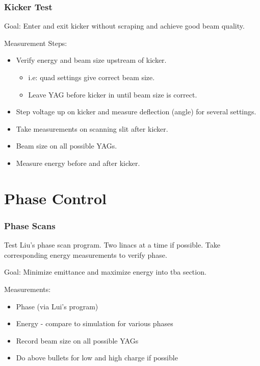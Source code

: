\documentclass[professionalfonts,t]{beamer}
\begin{document}
\begin{frame}
\frametitle{Kicker Test}
Goal: Enter and exit kicker without scraping and achieve good beam quality.
\vspace{1em}

Measurement Steps:
\begin{itemize}
	\item Verify energy and beam size upstream of kicker. 
	\begin{itemize}
		\item i.e: quad settings give correct beam size.
		\item Leave YAG before kicker in until beam size is correct.
	\end{itemize}
	
	\item Step voltage up on kicker and measure
	deflection (angle) for several settings.
	\item Take measurements on scanning slit after kicker.  
	\item Beam size on all possible YAGs. 
	\item Measure energy before and after kicker. 
\end{itemize}
\end{frame}

\section{Phase Control}
\begin{frame}
\frametitle{Phase Scans}
Test Liu's phase scan program.
Two linacs at a time if possible.
Take corresponding energy measurements to verify phase.
\vspace{1em}

Goal: Minimize emittance and maximize energy into tba section. 

\vspace{1em}
Measurements:
\begin{itemize}
	\item Phase (via Lui's program)
	\item Energy - compare to simulation for various phases
	\item Record beam size on all possible YAGs
	\item Do above bullets for low and high charge if possible
\end{itemize}
\end{frame}

\end{document}
